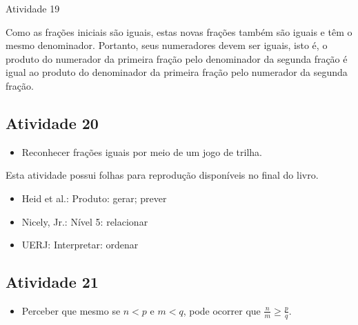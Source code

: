 \begin{multicols}{2}
\begin{resposta*}{Atividade 19}
\begin{enumerate} [\quad a)]
  Como as frações iniciais são iguais, estas novas frações também são iguais e 
têm o mesmo denominador. Portanto, seus numeradores devem ser iguais, isto é, o 
produto do numerador da primeira fração pelo denominador da segunda fração é 
igual ao produto do denominador da primeira fração pelo numerador da segunda 
fração.  
\end{enumerate} %

  \end{resposta*}



 \vspace*{\fill}
\columnbreak

\subsection{Atividade 20}

\begin{itemize} %
    \item       Reconhecer frações iguais por meio de um jogo de trilha.
\end{itemize} %
  
  
  Esta atividade possui folhas para reprodução disponíveis no final do 
livro.
  
   \vspace{.1cm}
  
 \vspace{.1cm}
   
\begin{itemize} %
    \item       Heid et al.: Produto: gerar; prever
    \item       Nicely, Jr.: Nível 5: relacionar
    \item       UERJ: Interpretar: ordenar
\end{itemize} %
  
  \Bg
  
\subsection{Atividade 21}

\begin{itemize} %
    \item       Perceber que mesmo se       $n < p$       e       $m < q$, pode 
ocorrer que       $\frac{n}{m} \geq \frac{p}{q}$.
\end{itemize} %
  

\end{multicols}
